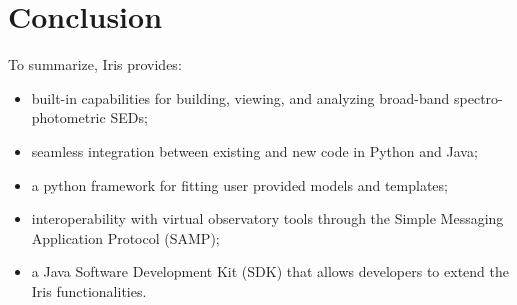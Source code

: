 \documentclass[5p]{elsarticle}
\begin{document}
\section{Conclusion}
\label{sec:conclusion}

To summarize, Iris provides:
\begin{itemize}
\item built-in capabilities for building, viewing, and analyzing broad-band spectro-photometric SEDs;
\item seamless integration between existing and new code in Python and Java;
\item a python framework for fitting user provided models and templates;
\item interoperability with virtual observatory tools through the Simple Messaging Application Protocol (SAMP);
\item a Java Software Development Kit (SDK) that allows developers to extend the Iris functionalities.
\end{itemize}










\end{document}
